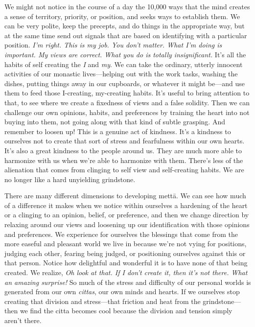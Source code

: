 We might not notice in the course of a day the 10,000 ways that the 
mind creates a sense of territory, priority, or position, and seeks 
ways to establish them. We can be very polite, keep the precepts, and 
do things in the appropriate way, but at the same time send out signals 
that are based on identifying with a particular position. \emph{I'm 
right. This is my job. You don't matter. What I'm doing is important. 
My views are correct. What you do is totally insignificant.} It's all 
the habits of self creating the \emph{I} and \emph{my}. We can take the 
ordinary, utterly innocent activities of our monastic lives---helping 
out with the work tasks, washing the dishes, putting things away in our 
cupboards, or whatever it might be---and use them to feed those 
I-creating, my-creating habits. It's useful to bring attention to that, 
to see where we create a fixedness of views and a false solidity. Then 
we can challenge our own opinions, habits, and preferences by training 
the heart into not buying into them, not going along with that kind of 
subtle grasping. And remember to loosen up! This is a genuine act of 
kindness. It's a kindness to ourselves not to create that sort of 
stress and fearfulness within our own hearts. It's also a great 
kindness to the people around us. They are much more able to harmonize 
with us when we're able to harmonize with them. There's less of the 
alienation that comes from clinging to self view and self-creating 
habits. We are no longer like a hard unyielding grindstone.

There are many different dimensions to developing mettā. We can see 
how much of a difference it makes when we notice within ourselves a 
hardening of the heart or a clinging to an opinion, belief, or 
preference, and then we change direction by relaxing around our views 
and loosening up our identification with those opinions and 
preferences. We experience for ourselves the blessings that come from 
the more easeful and pleasant world we live in because we're not vying 
for positions, judging each other, fearing being judged, or positioning 
ourselves against this or that person. Notice how delightful and 
wonderful it is to have none of that being created. We realize, 
\emph{Oh look at that. If I don't create it, then it's not there. What 
an amazing surprise!} So much of the stress and difficulty of our 
personal worlds is generated from our own \emph{cittas}, our own minds 
and hearts. If we ourselves stop creating that division and 
stress---that friction and heat from the grindstone---then we find the 
citta becomes cool because the division and tension simply aren't there.

